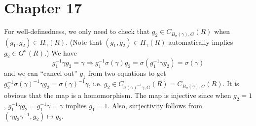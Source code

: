 \newpage
\section{Chapter 17}

\begin{problem} \notfinish
\end{problem}

\begin{problem} \notfinish
\end{problem}

\begin{problem} \notfinish
\end{problem}

\begin{problem} \notfinish
\end{problem}

\begin{problem} \notfinish
\end{problem}

\begin{problem} \notfinish
\end{problem}

\begin{problem} \notfinish
\end{problem}

\begin{problem} \notfinish
\end{problem}

\begin{problem} \notfinish
\end{problem}

\begin{problem} \notfinish
\end{problem}

\begin{problem}
For well-definedness, we only need to check that $g_2 \in C_{B_{\sigma}(\gamma), G}(R)$ when $(g_1, g_2) \in H_\gamma(R)$.
(Note that $(g_1, g_2) \in H_{\gamma}(R)$ automatically implies $g_{2} \in G^{\sigma}(R)$.)
We have 
$$
g_1^{-1}\gamma g_{2} = \gamma \Rightarrow g_{1}^{-1}\sigma(\gamma)g_{2} = \sigma(g_{1}^{-1}\gamma g_{2}) = \sigma(\gamma)
$$
and we can ``cancel out'' $g_1$ from two equations to get $g_{2}^{-1}\sigma(\gamma)^{-1}\gamma g_{2} = \sigma(\gamma)^{-1}\gamma$, i.e. $g_{2} \in C_{\sigma(\gamma)^{-1}\gamma, G}(R) = C_{B_{\sigma}(\gamma), G}(R)$.
It is obvious that the map is a homomorphism.
The map is injective since when $g_2 = 1$, $g_{1}^{-1}\gamma g_{2} = g_{1}^{-1}\gamma = \gamma$ implies $g_{1} = 1$.
Also, surjectivity follows from $(\gamma g_2 \gamma^{-1}, g_2)\mapsto g_2$.
\end{problem}


